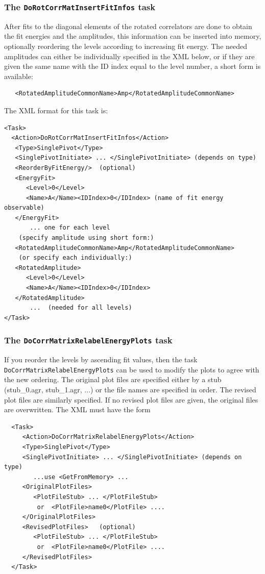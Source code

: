 \documentclass[12pt]{article}
\newcommand{\vb}{\texttt}
\begin{document}
\subsubsection{The \vb{DoRotCorrMatInsertFitInfos} task}
After fits to the diagonal elements of the rotated correlators are done
to obtain the fit energies and the amplitudes, this information can be
inserted into memory, optionally reordering the levels according to
increasing fit energy. The needed amplitudes can either be individually
specified in the XML below, or if they are given the same name with the ID
index equal to the level number, a short form is available:
\begin{verbatim}
   <RotatedAmplitudeCommonName>Amp</RotatedAmplitudeCommonName>
\end{verbatim}

The XML format for this task is:
\begin{verbatim}
<Task>
  <Action>DoRotCorrMatInsertFitInfos</Action>
   <Type>SinglePivot</Type>
   <SinglePivotInitiate> ... </SinglePivotInitiate> (depends on type)
   <ReorderByFitEnergy/>  (optional)
   <EnergyFit>
      <Level>0</Level>
      <Name>A</Name><IDIndex>0</IDIndex> (name of fit energy observable)
   </EnergyFit>
       ... one for each level
    (specify amplitude using short form:)
   <RotatedAmplitudeCommonName>Amp</RotatedAmplitudeCommonName>
    (or specify each individually:)
   <RotatedAmplitude>
      <Level>0</Level>
      <Name>A</Name><IDIndex>0</IDIndex>
   </RotatedAmplitude>
       ...  (needed for all levels)
</Task>
\end{verbatim}

\subsubsection{The \vb{DoCorrMatrixRelabelEnergyPlots} task}
If you reorder the levels by ascending fit values, then the task\newline
\vb{DoCorrMatrixRelabelEnergyPlots} can be used to modify the plots to
agree with the new ordering.  The original plot files are specified either
by a stub (stub\_0.agr, stub\_1.agr, ...) or the file names are specified
in order.  The revised plot files are similarly specified.  If no revised
plot files are given, the original files are overwritten.  The XML must
have the form

\begin{verbatim}
  <Task>
     <Action>DoCorrMatrixRelabelEnergyPlots</Action>
     <Type>SinglePivot</Type>
     <SinglePivotInitiate> ... </SinglePivotInitiate> (depends on type)
        ...use <GetFromMemory> ...
     <OriginalPlotFiles>
        <PlotFileStub> ... </PlotFileStub>
         or  <PlotFile>name0</PlotFile> ....
     </OriginalPlotFiles>
     <RevisedPlotFiles>   (optional)
        <PlotFileStub> ... </PlotFileStub>
         or  <PlotFile>name0</PlotFile> ....
     </RevisedPlotFiles>
  </Task>
\end{verbatim}
\end{document}
